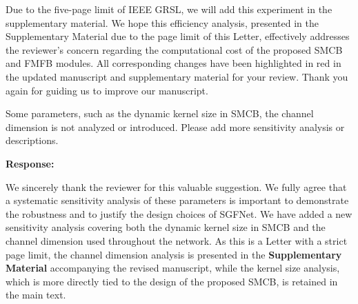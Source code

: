 \begin{table}[h]
  \centering
  \caption*{\textcolor{red}{TABLE: Comparison of computational complexity on the Houston2018 dataset.}}
\end{table}

Due to the five-page limit of IEEE GRSL, we will add this experiment in the supplementary material. We hope this efficiency analysis, presented in the Supplementary Material due to the page limit of this Letter, effectively addresses the reviewer's concern regarding the computational cost of the proposed SMCB and FMFB modules. All corresponding changes have been highlighted in red in the updated manuscript and supplementary material for your review. Thank you again for guiding us to improve our manuscript.

\vspace{2em}

\begin{tcolorbox}[title={Reviewer \#3, Comment \#2}]
  \vspace{1em}
  
  \color{blue}
  Some parameters, such as the dynamic kernel size in SMCB, the channel dimension is not analyzed or introduced. Please add more sensitivity analysis or descriptions.

  \vspace{1em}
\end{tcolorbox}

\textbf{Response:}

We sincerely thank the reviewer for this valuable suggestion. We fully agree that a systematic sensitivity analysis of these parameters is important to demonstrate the robustness and to justify the design choices of SGFNet. We have added a new sensitivity analysis covering both the dynamic kernel size in SMCB and the channel dimension used throughout the network. As this is a Letter with a strict page limit, the channel dimension analysis is presented in the \textbf{Supplementary Material} accompanying the revised manuscript, while the kernel size analysis, which is more directly tied to the design of the proposed SMCB, is retained in the main text.

